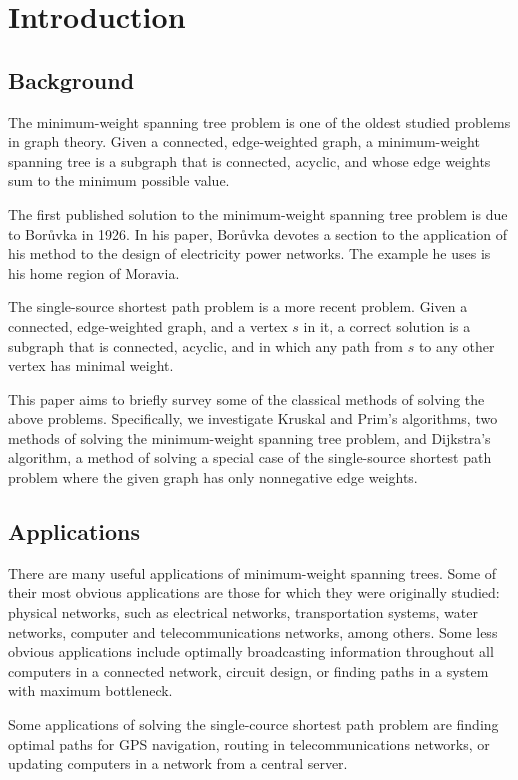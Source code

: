 \documentclass[11pt]{article}
\begin{document}
\section{Introduction}
\subsection{Background}
The minimum-weight spanning tree problem is one of the oldest studied problems
in graph theory. Given a connected, edge-weighted graph, a minimum-weight
spanning tree is a subgraph that is connected, acyclic, and whose edge weights
sum to the minimum possible value.

The first published solution to the minimum-weight spanning tree problem is due
to Bor\r{u}vka in 1926\cite{Boruvka}. In his paper, Bor\r{u}vka devotes a section to the
application of his method to the design of electricity power networks. The
example he uses is his home region of Moravia.

The single-source shortest path problem is a more recent problem. Given a
connected, edge-weighted graph, and a vertex $s$ in it, a correct solution is a
subgraph that is connected, acyclic, and in which any path from $s$ to any
other vertex has minimal weight.

This paper aims to briefly survey some of the classical methods of solving the
above problems. Specifically, we investigate Kruskal and Prim's algorithms, two
methods of solving the minimum-weight spanning tree problem, and Dijkstra's
algorithm, a method of solving a special case of the single-source shortest
path problem where the given graph has only nonnegative edge weights.


\subsection{Applications}
There are many useful applications of minimum-weight spanning trees. Some of
their most obvious applications are those for which they were originally
studied: physical networks, such as electrical networks, transportation systems,
water networks, computer and telecommunications networks, among others. Some
less obvious applications include optimally broadcasting information throughout
all computers in a connected network, circuit design, or finding paths in a
system with maximum bottleneck.

Some applications of solving the single-cource shortest path problem are
finding optimal paths for GPS navigation, routing in telecommunications
networks, or updating computers in a network from a central server.
\end{document}
